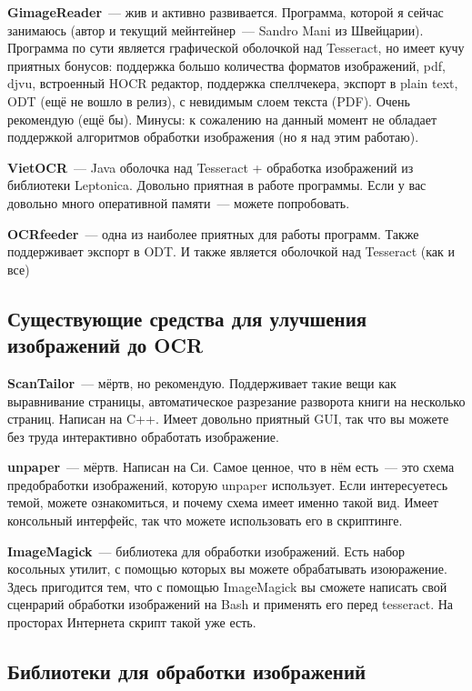 \documentclass[10pt, a5paper]{article}
\begin{document}
\textbf{GimageReader}~--- жив и активно развивается. Программа, которой я сейчас занимаюсь (автор и текущий мейнтейнер~--- Sandro Mani из Швейцарии). Программа по сути является графической оболочкой над Tesseract, но имеет кучу приятных бонусов: поддержка большо количества форматов изображений, pdf, djvu, встроенный HOCR редактор, поддержка спеллчекера, экспорт в plain text, ODT (ещё не вошло в релиз), с невидимым слоем текста (PDF). Очень рекомендую (ещё бы). Минусы: к сожалению на данный момент не обладает поддержкой алгоритмов обработки изображения (но я над этим работаю).

\textbf{VietOCR}~--- Java оболочка над Tesseract + обработка изображений из библиотеки Leptonica. Довольно приятная в работе программы. Если у вас довольно много оперативной памяти~--- можете попробовать.

\textbf{OCRfeeder}~--- одна из наиболее приятных для работы программ. Также поддерживает экспорт в ODT. И также является оболочкой над Tesseract (как и все)

\subsection*{Существующие средства для улучшения изображений до OCR}

\textbf{ScanTailor}~--- мёртв, но рекомендую. Поддерживает такие вещи как выравнивание страницы, автоматическое разрезание разворота книги на несколько страниц. Написан на C++. Имеет довольно приятный GUI, так что вы можете без труда интерактивно обработать изображение.

\textbf{unpaper}~--- мёртв. Написан на Си. Самое ценное, что в нём есть~--- это схема предобработки изображений, которую unpaper использует. Если интересуетесь темой, можете ознакомиться, и почему схема имеет именно такой вид. Имеет консольный интерфейс, так что можете использовать его в скриптинге.

\textbf{ImageMagick}~--- библиотека для обработки изображений. Есть набор косольных утилит, с помощью которых вы можете обрабатывать изоюражение. Здесь пригодится тем, что с помощью \linebreak ImageMagick вы сможете написать свой сценрарий обработки изображений на Bash и применять его перед tesseract. На просторах Интернета скрипт такой уже есть.

\subsection*{Библиотеки для обработки изображений}
\end{document}
